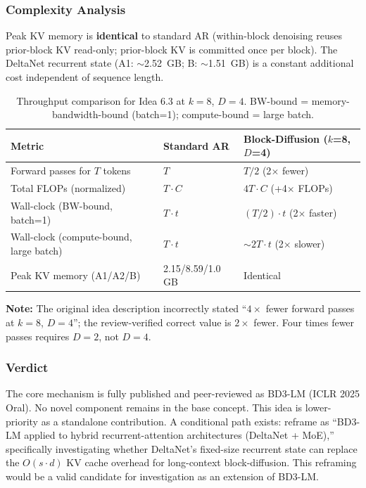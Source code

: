 \documentclass[11pt]{article}
\begin{document}
\subsubsection*{Complexity Analysis}

Peak KV memory is \textbf{identical} to standard AR (within-block denoising reuses prior-block KV read-only; prior-block KV is committed once per block). The DeltaNet recurrent state (A1: $\sim$2.52~GB; B: $\sim$1.51~GB) is a constant additional cost independent of sequence length.

\begin{table}[h]
\centering
\caption{Throughput comparison for Idea 6.3 at $k=8$, $D=4$. BW-bound = memory-bandwidth-bound (batch=1); compute-bound = large batch.}
\label{tab:idea63_complexity}
\small
\begin{tabular}{lll}
\hline
\textbf{Metric} & \textbf{Standard AR} & \textbf{Block-Diffusion ($k$=8, $D$=4)} \\
\hline
Forward passes for $T$ tokens & $T$ & $T/2$ (2$\times$ fewer) \\
Total FLOPs (normalized) & $T \cdot C$ & $4T \cdot C$ (+4$\times$ FLOPs) \\
Wall-clock (BW-bound, batch=1) & $T \cdot t$ & $(T/2) \cdot t$ (2$\times$ faster) \\
Wall-clock (compute-bound, large batch) & $T \cdot t$ & $\sim 2T \cdot t$ (2$\times$ slower) \\
Peak KV memory (A1/A2/B) & 2.15/8.59/1.0 GB & Identical \\
\hline
\end{tabular}
\end{table}

\noindent\textbf{Note:} The original idea description incorrectly stated ``$4\times$ fewer forward passes at $k=8$, $D=4$''; the review-verified correct value is $2\times$ fewer. Four times fewer passes requires $D=2$, not $D=4$.

\subsubsection*{Verdict}

The core mechanism is fully published and peer-reviewed as BD3-LM (ICLR 2025 Oral). No novel component remains in the base concept. This idea is lower-priority as a standalone contribution. A conditional path exists: reframe as ``BD3-LM applied to hybrid recurrent-attention architectures (DeltaNet + MoE),'' specifically investigating whether DeltaNet's fixed-size recurrent state can replace the $O(s \cdot d)$ KV cache overhead for long-context block-diffusion. This reframing would be a valid candidate for investigation as an extension of BD3-LM.
\end{document}
